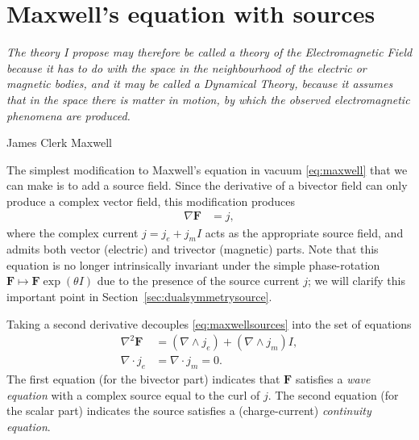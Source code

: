\documentclass[1p,sort&compress]{elsarticle}
\numberwithin{equation}{section}
\newcommand{\bv}[1]{\mathbf{#1}}
\newcommand\epigraph[3]{
\vspace{1em}\hfill{}\begin{minipage}{#1}{\begin{spacing}{0.9}
\small\noindent\textit{#2}\end{spacing}
\vspace{1em}
\hfill{}{#3}}\vspace{2em}
\end{minipage}}
\begin{document}

\section{Maxwell's equation with sources}\label{sec:source}

\epigraph{4.5in}{The theory I propose may therefore be called a theory of the \emph{Electromagnetic Field} because it has to do with the space in the neighbourhood of the electric or magnetic bodies, and it may be called a \emph{Dynamical Theory}, because it assumes that in the space there is matter in motion, by which the observed electromagnetic phenomena are produced.}{James Clerk Maxwell \cite{Maxwell1865}}


The simplest modification to Maxwell's equation in vacuum \eqref{eq:maxwell} that we can make is to add a source field.  Since the derivative of a bivector field can only produce a complex vector field, this modification produces 
\begin{align}\label{eq:maxwellsources}
  \nabla \bv{F} &= j,
\end{align}
where the complex current $j = j_e + j_m I$ acts as the appropriate source field, and admits both vector (electric) and trivector (magnetic) parts.  Note that this equation is no longer intrinsically invariant under the simple phase-rotation $\bv{F} \mapsto \bv{F}\exp(\theta I)$ due to the presence of the source current $j$; we will clarify this important point in Section~\ref{sec:dualsymmetrysource}.

Taking a second derivative decouples \eqref{eq:maxwellsources} into the set of equations
\begin{align}
  \nabla^2 \bv{F} &= (\nabla \wedge j_e) + (\nabla \wedge j_m)I, \\
  \label{eq:currentcontinuity}
  \nabla \cdot j_e &= \nabla \cdot j_m = 0. 
\end{align}
The first equation (for the bivector part) indicates that $\bv{F}$ satisfies a \emph{wave equation} with a complex source equal to the curl of $j$.  The second equation (for the scalar part) indicates the source satisfies a (charge-current) \emph{continuity equation}.
\end{document}
